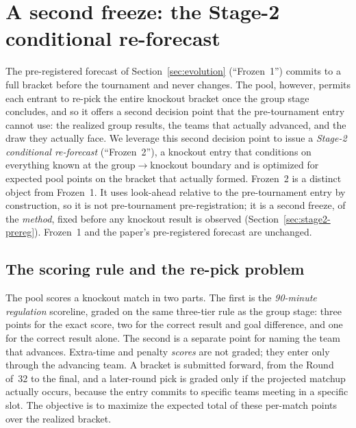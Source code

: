
\section{A second freeze: the Stage-2 conditional re-forecast}\label{sec:stage2}

The pre-registered forecast of Section~\ref{sec:evolution} (``Frozen~1'') commits to
a full bracket before the tournament and never changes. The pool, however,
permits each entrant to re-pick the entire knockout bracket once the group stage
concludes, and so it offers a second decision point that the pre-tournament entry
cannot use: the realized group results, the teams that actually advanced, and the
draw they actually face. We leverage this second decision point to issue a
\emph{Stage-2 conditional re-forecast} (``Frozen~2''), a knockout entry that
conditions on everything known at the group$\rightarrow$knockout boundary and is
optimized for expected pool points on the bracket that actually formed. Frozen~2
is a distinct object from Frozen~1. It uses look-ahead relative to the
pre-tournament entry by construction, so it is not pre-tournament
pre-registration; it is a second freeze, of the \emph{method}, fixed before any
knockout result is observed (Section~\ref{sec:stage2-prereg}). Frozen~1 and the
paper's pre-registered forecast are unchanged.

\subsection{The scoring rule and the re-pick problem}\label{sec:stage2-rule}

The pool scores a knockout match in two parts. The first is the
\emph{90-minute regulation} scoreline, graded on the same three-tier rule as the
group stage: three points for the exact score, two for the correct result and
goal difference, and one for the correct result alone. The second is a separate
point for naming the team that advances. Extra-time and penalty \emph{scores} are
not graded; they enter only through the advancing team. A bracket is submitted
forward, from the Round of~32 to the final, and a later-round pick is graded only
if the projected matchup actually occurs, because the entry commits to specific
teams meeting in a specific slot. The objective is to maximize the expected total
of these per-match points over the realized bracket.


